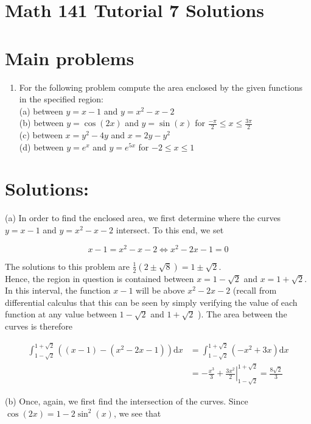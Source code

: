 \documentclass[10pt]{article}
\begin{document}
\section*{Math 141 Tutorial 7 Solutions}
\section*{Main problems}
\begin{enumerate}
  \item For the following problem compute the area enclosed by the given functions in the specified region:\\
(a) between $y=x-1$ and $y=x^{2}-x-2$\\
(b) between $y=\cos (2 x)$ and $y=\sin (x)$ for $\frac{-\pi}{2} \leq x \leq \frac{3 \pi}{2}$\\
(c) between $x=y^{2}-4 y$ and $x=2 y-y^{2}$\\
(d) between $y=e^{x}$ and $y=e^{5 x}$ for $-2 \leq x \leq 1$
\end{enumerate}

\section*{Solutions:}
(a) In order to find the enclosed area, we first determine where the curves $y=x-1$ and $y=x^{2}-x-2$ intersect. To this end, we set

$$
x-1=x^{2}-x-2 \Longleftrightarrow x^{2}-2 x-1=0
$$

The solutions to this problem are $\frac{1}{2}(2 \pm \sqrt{8})=1 \pm \sqrt{2}$.\\
Hence, the region in question is contained between $x=1-\sqrt{2}$ and $x=1+\sqrt{2}$. In this interval, the function $x-1$ will be above $x^{2}-2 x-2$ (recall from differential calculus that this can be seen by simply verifying the value of each function at any value between $1-\sqrt{2}$ and $1+\sqrt{2}$ ). The area between the curves is therefore

$$
\begin{aligned}
\int_{1-\sqrt{2}}^{1+\sqrt{2}}\left((x-1)-\left(x^{2}-2 x-1\right)\right) \mathrm{d} x & =\int_{1-\sqrt{2}}^{1+\sqrt{2}}\left(-x^{2}+3 x\right) \mathrm{d} x \\
& =-\frac{x^{3}}{3}+\left.\frac{3 x^{2}}{2}\right|_{1-\sqrt{2}} ^{1+\sqrt{2}}=\frac{8 \sqrt{2}}{3}
\end{aligned}
$$

(b) Once, again, we first find the intersection of the curves. Since $\cos (2 x)=1-2 \sin ^{2}(x)$, we see that
\end{document}
